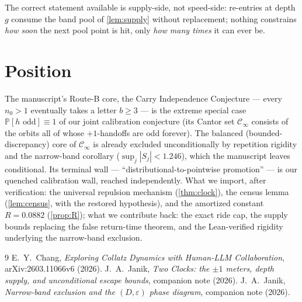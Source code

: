 \documentclass[11pt]{article}
\begin{document}
\noindent The correct statement available is supply-side, not
speed-side: re-entries at depth $g$ consume the band pool of
\cref{lem:supply} without replacement; nothing constrains \emph{how
soon} the next pool point is hit, only \emph{how many times} it can
ever be.

\section{Position}

The manuscript's Route-B core, the Carry Independence Conjecture ---
every $n_0>1$ eventually takes a letter $b\ge3$ --- is the extreme
special case $\mathbb P[h\text{ odd}]\equiv1$ of our joint calibration
conjecture (its Cantor set $\mathcal C_\infty$ consists of the orbits
all of whose $+1$-handoffs are odd forever). The balanced
(bounded-discrepancy) core of $\mathcal C_\infty$ is already excluded
unconditionally by repetition rigidity and the narrow-band corollary
($\sup_j|S_j|<1.246$), which the manuscript leaves conditional. Its
terminal wall --- ``distributional-to-pointwise promotion'' --- is our
quenched calibration wall, reached independently. What we import,
after verification: the universal repulsion mechanism
(\cref{thm:clock}), the census lemma (\cref{lem:census}, with the
restored hypothesis), and the amortized constant
$R=0.0882$ (\cref{prop:R}); what we contribute back: the exact ride
cap, the supply bounds replacing the false return-time theorem, and
the Lean-verified rigidity underlying the narrow-band exclusion.

\begin{thebibliography}{9}
 E.~Y.~Chang, \emph{Exploring Collatz Dynamics with
Human-LLM Collaboration}, arXiv:2603.11066v6 (2026).
 J.~A.~Janik, \emph{Two Clocks: the $\pm1$ meters,
depth supply, and unconditional escape bounds}, companion note (2026).
 J.~A.~Janik, \emph{Narrow-band exclusion and the
$(D,\varepsilon)$ phase diagram}, companion note (2026).
\end{thebibliography}
\end{document}
